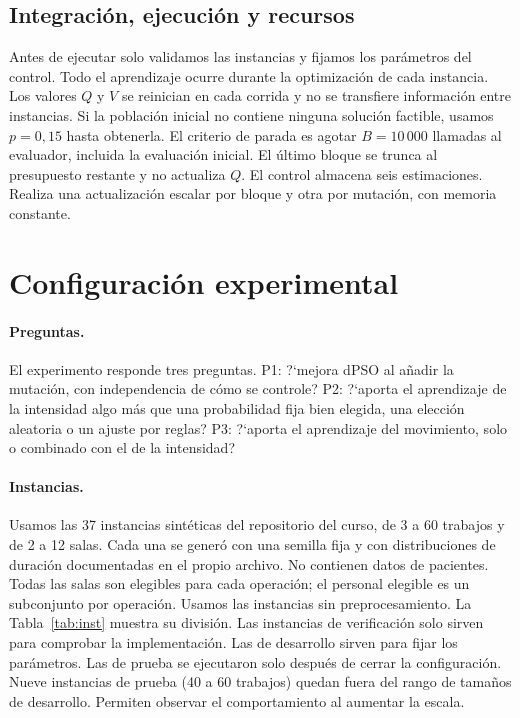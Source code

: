 \documentclass[10pt,a4paper]{article}
\newcommand{\dc}{{,}}%
\begin{document}
\subsection{Integración, ejecución y recursos}

Antes de ejecutar solo validamos las instancias y fijamos los parámetros del control. Todo el
aprendizaje ocurre durante la optimización de cada instancia. Los valores $Q$ y $V$ se
reinician en cada corrida y no se transfiere información entre instancias. Si la población
inicial no contiene ninguna solución factible, usamos $p=0\dc15$ hasta obtenerla. El criterio
de parada es agotar $B=10\,000$ llamadas al evaluador, incluida la evaluación inicial. El último
bloque se trunca al presupuesto restante y no actualiza $Q$. El control almacena seis
estimaciones. Realiza una actualización escalar por bloque y otra por mutación, con memoria
constante.

\section{Configuración experimental}
\label{sec:exp}

\paragraph{Preguntas.}
El experimento responde tres preguntas. P1: ?`mejora dPSO al añadir la mutación, con
independencia de cómo se controle? P2: ?`aporta el aprendizaje de la intensidad algo más que
una probabilidad fija bien elegida, una elección aleatoria o un ajuste por reglas? P3: ?`aporta
el aprendizaje del movimiento, solo o combinado con el de la intensidad?

\paragraph{Instancias.}
Usamos las 37 instancias sintéticas del repositorio del curso, de 3 a 60 trabajos y de 2 a 12
salas. Cada una se generó con una semilla fija y con distribuciones de duración documentadas en
el propio archivo. No contienen datos de pacientes. Todas las salas son elegibles para cada
operación; el personal elegible es un subconjunto por operación. Usamos las instancias sin
preprocesamiento. La Tabla~\ref{tab:inst} muestra su división. Las instancias de verificación
solo sirven para comprobar la implementación. Las de desarrollo sirven para fijar los
parámetros. Las de prueba se ejecutaron solo después de cerrar la configuración. Nueve
instancias de prueba (40 a 60 trabajos) quedan fuera del rango de tamaños de desarrollo.
Permiten observar el comportamiento al aumentar la escala.
\end{document}
